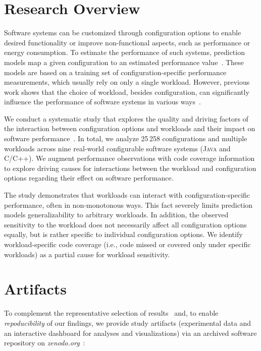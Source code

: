 \documentclass[10pt,conference]{IEEEtran}
\begin{document}
	\section{Research Overview}
	Software systems can be customized through configuration options to enable desired functionality or improve non-functional aspects, such as performance or energy consumption. To estimate the performance of such systems, prediction models map a given configuration to an estimated performance value~\cite{pereira_2021_learning,kaltenecker_interplay_2020}. These models are based on a training set of configuration-specific performance measurements, which usually rely on only a single workload. However, previous work shows that the choice of workload, besides configuration, can significantly influence the performance of software systems in various ways~\cite{alves_sampling_2020,lesoil_2021}.  
	
	We conduct a systematic study that explores the quality and driving factors of the interaction between configuration options and workloads and their impact on software performance~\cite{muhlbauer_workload_2023}. In total, we analyze 25\,258 configurations and multiple workloads across nine real-world configurable software systems (\textsc{Java} and \textsc{C}/\textsc{C++}). We augment performance observations with code coverage information to explore driving causes for interactions between the workload and configuration options regarding their effect on software performance. 
	
	The study demonstrates that workloads can interact with configuration-specific performance, often in non-monotonous ways. This fact severely limits prediction models generalizability to arbitrary workloads. In addition, the observed sensitivity to the workload does not necessarily affect all configuration options equally, but is rather specific to individual configuration options. We identify workload-specific code coverage (i.e., code missed or covered only under specific workloads) as a partial cause for workload sensitivity.
	
	\section{Artifacts}
	To complement the representative selection of results~\cite{muhlbauer_workload_2023} and, to enable \textit{repoducibility} of our findings, we provide study artifacts (experimental data and an interactive dashboard for analyses and visualizations) via an archived software repository on \textit{zenodo.org}~\cite{muhlbauer_workload_2023_companion}:
\end{document}
